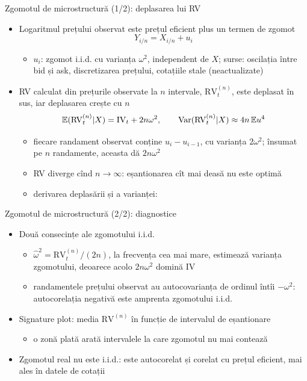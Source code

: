 \begin{frame}{Zgomotul de microstructură (1/2): deplasarea lui RV}
\itemsize{\small}
\begin{itemize}
    \item \hypertarget{ch8noise}{}Logaritmul prețului observat este prețul eficient plus un termen de zgomot
    \[ Y_{i/n} = X_{i/n} + u_i \]
    \begin{itemize}
        \item $u_i$: zgomot i.i.d. cu varianța $\omega^2$, independent de $X$; surse: oscilația între bid și ask, discretizarea prețului, cotațiile stale (neactualizate)
    \end{itemize}
    \item RV calculat din prețurile observate la $n$ intervale, $\mathrm{RV}^{(n)}_t$, este deplasat în sus, iar deplasarea crește cu $n$
    \[ \mathbb{E}(\mathrm{RV}^{(n)}_t | X) = \mathrm{IV}_t + 2n\omega^2, \qquad \text{Var}(\mathrm{RV}^{(n)}_t | X) \approx 4n\,\mathbb{E} u^4 \]
    \begin{itemize}
        \item fiecare randament observat conține $u_i - u_{i-1}$, cu varianța $2\omega^2$; însumat pe $n$ randamente, aceasta dă $2n\omega^2$
        \item RV diverge cînd $n \to \infty$: eșantionarea cît mai deasă nu este optimă
        \item derivarea deplasării și a varianței:   %
    \end{itemize}
\end{itemize}
\end{frame}

\begin{frame}{Zgomotul de microstructură (2/2): diagnostice}
\itemsize{\small}
\begin{itemize}
    \item Două consecințe ale zgomotului i.i.d.
    \begin{itemize}
        \item $\hat\omega^2 = \mathrm{RV}^{(n)}_t/(2n)$, la frecvența cea mai mare, estimează varianța zgomotului, deoarece acolo $2n\omega^2$ domină IV
        \item randamentele prețului observat au autocovarianța de ordinul întîi $-\omega^2$: autocorelația negativă este amprenta zgomotului i.i.d.
    \end{itemize}
    \item Signature plot: media $\mathrm{RV}^{(n)}$ în funcție de intervalul de eșantionare
    \begin{itemize}
        \item o zonă plată arată intervalele la care zgomotul nu mai contează
    \end{itemize}
    \item Zgomotul real nu este i.i.d.: este autocorelat și corelat cu prețul eficient, mai ales în datele de cotații 
\end{itemize}
\end{frame}

